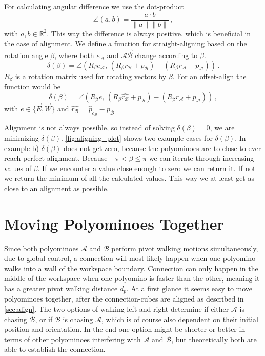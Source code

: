 For calculating angular difference we use the dot-product
\begin{equation*}
\angle (a,b) = \frac{a \cdot b}{\lVert a \rVert \lVert b \rVert} \,,
\end{equation*}
with $a,b \in \mathbb{R}^2$. This way the difference is always positive, which is beneficial in the case of alignment.
We define a function for straight-aligning based on the rotation angle $\beta$, where both $e_\mathcal{A}$ and $\overrightarrow{\mathcal{A}\mathcal{B}}$ change according to $\beta$.
\begin{equation}
\delta(\beta) = \angle \left( R_\beta e_\mathcal{A}, \, \left( R_\beta r_\mathcal{B} + p_\mathcal{B} \right) - \left( R_\beta r_\mathcal{A} + p_\mathcal{A} \right)\right) \,.
\end{equation}
$R_\beta$ is a rotation matrix used for rotating vectors by $\beta$.
For an offset-align the function would be
\begin{equation}
\delta(\beta) = \angle \left( R_\beta e, \, \left( R_\beta \hat{r_\mathcal{B}} + p_\mathcal{B} \right) - \left( R_\beta r_\mathcal{A} + p_\mathcal{A} \right)\right) \,,
\end{equation}
with $e \in \{ \vec{E}, \vec{W}\}$ and $\hat{r_\mathcal{B}} = \hat{p}_{c_\mathcal{B}} - p_\mathcal{B}$

Alignment is not always possible, so instead of solving $\delta(\beta) = 0$, we are minimizing $\delta(\beta)$.
\autoref{fig:aligning_plot} shows two example cases for $\delta(\beta)$.
In example b) $\delta(\beta)$ does not get zero, because the polyominoes are to close to ever reach perfect alignment.
Because $-\pi < \beta \leq \pi$ we can iterate through increasing values of $\beta$.
If we encounter a value close enough to zero we can return it.
If not we return the minimum of all the calculated values.
This way we at least get as close to an alignment as possible.


\section{Moving Polyominoes Together}
\label{sec:walk_wait}

Since both polyominoes $\mathcal{A}$ and $\mathcal{B}$ perform pivot walking motions simultaneously, due to global control, a connection will most likely happen when one polyomino walks into a wall of the workspace boundary.
Connection can only happen in the middle of the workspace when one polyomino is faster than the other, meaning it has a greater pivot walking distance $d_p$.
At a first glance it seems easy to move polyominoes together, after the connection-cubes are aligned as described in \autoref{sec:align}.
The two options of walking left and right determine if either $\mathcal{A}$ is chasing $\mathcal{B}$, or if $\mathcal{B}$ is chasing $\mathcal{A}$, which is of course also dependent on their initial position and orientation.
In the end one option might be shorter or better in terms of other polyominoes interfering with $\mathcal{A}$ and $\mathcal{B}$, but theoretically both are able to establish the connection.

